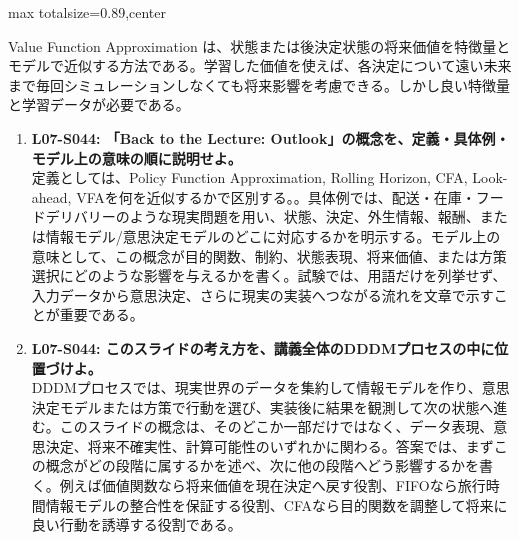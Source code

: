 \begin{minipage}[t]{0.58\textwidth}
\begin{adjustbox}{max totalsize={\textwidth}{0.89\textheight},center}
\begin{minipage}{\textwidth}
Value Function Approximation は、状態または後決定状態の将来価値を特徴量とモデルで近似する方法である。学習した価値を使えば、各決定について遠い未来まで毎回シミュレーションしなくても将来影響を考慮できる。しかし良い特徴量と学習データが必要である。\par{}\begin{enumerate}\item \textbf{L07-S044: 「Back to the Lecture: Outlook」の概念を、定義・具体例・モデル上の意味の順に説明せよ。}\\定義としては、Policy Function Approximation, Rolling Horizon, CFA, Look-ahead, VFAを何を近似するかで区別する。。具体例では、配送・在庫・フードデリバリーのような現実問題を用い、状態、決定、外生情報、報酬、または情報モデル/意思決定モデルのどこに対応するかを明示する。モデル上の意味として、この概念が目的関数、制約、状態表現、将来価値、または方策選択にどのような影響を与えるかを書く。試験では、用語だけを列挙せず、入力データから意思決定、さらに現実の実装へつながる流れを文章で示すことが重要である。\item \textbf{L07-S044: このスライドの考え方を、講義全体のDDDMプロセスの中に位置づけよ。}\\DDDMプロセスでは、現実世界のデータを集約して情報モデルを作り、意思決定モデルまたは方策で行動を選び、実装後に結果を観測して次の状態へ進む。このスライドの概念は、そのどこか一部だけではなく、データ表現、意思決定、将来不確実性、計算可能性のいずれかに関わる。答案では、まずこの概念がどの段階に属するかを述べ、次に他の段階へどう影響するかを書く。例えば価値関数なら将来価値を現在決定へ戻す役割、FIFOなら旅行時間情報モデルの整合性を保証する役割、CFAなら目的関数を調整して将来に良い行動を誘導する役割である。\end{enumerate}
\end{minipage}
\end{adjustbox}
\end{minipage}

